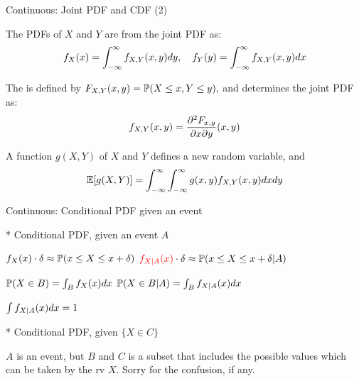\begin{frame}{Continuous: Joint PDF and CDF (2)}

\plitemsep 0.1in
\bce
\item<1->[2.] The  PDFs of $X$ and $Y$ are from the joint PDF as:
$$
f_X(x) = \int_{-\infty}^\infty f_{X,Y}(x,y) dy, \quad f_Y(y) = \int_{-\infty}^\infty f_{X,Y}(x,y) dx
$$

\item<2->[3.] The  is defined by $F_{X,Y}(x,y) = \mathbb{P}( X \le x, Y \le y ),$ and determines the joint PDF as:
$$
f_{X,Y}(x,y) = \frac{\partial^2 F_{x,y}}{\partial x \partial y} (x,y)
$$

\item<3->[4.] A function $g(X,Y)$ of $X$ and $Y$ defines a new random variable, and
$$
\mathbb{E}[ g(X,Y) ] = \int_{-\infty}^\infty \int_{-\infty}^\infty g(x,y) f_{X,Y}(x,y) dx dy
$$
\ece

\end{frame}

\begin{frame}{Continuous:  Conditional PDF given an event}

{
* Conditional PDF, given an event $A$

\medskip

\plitemsep 0.15in
\bci
\item<2-> $f_X(x) \cdot \delta \approx \mathbb{P}( x \le X \le x+\delta )$
${\color{red} f_{X|A}(x)} \cdot \delta \approx \mathbb{P}( x \le X \le x+\delta | A )$

\item<3-> $\mathbb{P}( X \in B ) = \int_B f_X(x) dx$
$\mathbb{P}( X \in B | A ) = \int_B f_{X|A}(x) dx$



\item<4-> $\int f_{X|A}(x) dx= 1$
\eci
}
{
* Conditional PDF, given $\{X \in C \}$

\medskip



}

 $A$ is an event, but $B$ and $C$ is a subset that includes the possible values which can be taken by the rv $X.$ Sorry for the confusion, if any.


\end{frame}

